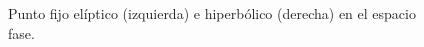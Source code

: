 \begin{figure}[h!]
	\centering
	\caption{Punto fijo elíptico (izquierda) e hiperbólico (derecha) en el espacio fase.}
	\label{hiperbolic}
\end{figure}




